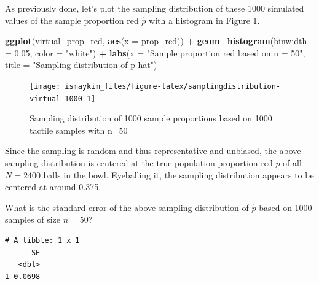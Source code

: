 \documentclass[12pt,]{krantz}
\makeatletter
\newenvironment{Shaded}{\begin{snugshade}}{\end{snugshade}}
\newcommand{\KeywordTok}[1]{\textcolor[rgb]{0.27,0.27,0.27}{\textbf{#1}}}
\newcommand{\DataTypeTok}[1]{\textcolor[rgb]{0.27,0.27,0.27}{#1}}
\newcommand{\FloatTok}[1]{\textcolor[rgb]{0.06,0.06,0.06}{#1}}
\newcommand{\StringTok}[1]{\textcolor[rgb]{0.5,0.5,0.5}{#1}}
\newcommand{\OperatorTok}[1]{\textcolor[rgb]{0.43,0.43,0.43}{\textbf{#1}}}
\newcommand{\NormalTok}[1]{#1}
\newenvironment{kframe}{%
\medskip{}
\setlength{\fboxsep}{.8em}
 \def\at@end@of@kframe{}%
 \ifinner\ifhmode%
  \def\at@end@of@kframe{\end{minipage}}%
  \begin{minipage}{\columnwidth}%
 \fi\fi%
 \def\FrameCommand##1{\hskip\@totalleftmargin \hskip-\fboxsep
 \colorbox{shadecolor}{##1}\hskip-\fboxsep
     \hskip-\linewidth \hskip-\@totalleftmargin \hskip\columnwidth}%
 \MakeFramed {\advance\hsize-\width
   \@totalleftmargin\z@ \linewidth\hsize
   \@setminipage}}%
 {\par\unskip\endMakeFramed%
 \at@end@of@kframe}
\renewenvironment{Shaded}{\begin{kframe}}{\end{kframe}}
\theoremstyle{definition}
\theoremstyle{definition}
\theoremstyle{definition}
\theoremstyle{remark}
\makeatother
\begin{document}
As previously done, let's plot the sampling distribution of these 1000
simulated values of the sample proportion red \(\widehat{p}\) with a
histogram in Figure \ref{fig:samplingdistribution-virtual-1000}.

\begin{Shaded}
\begin{Highlighting}[]
\KeywordTok{ggplot}\NormalTok{(virtual_prop_red, }\KeywordTok{aes}\NormalTok{(}\DataTypeTok{x =}\NormalTok{ prop_red)) }\OperatorTok{+}
\StringTok{  }\KeywordTok{geom_histogram}\NormalTok{(}\DataTypeTok{binwidth =} \FloatTok{0.05}\NormalTok{, }\DataTypeTok{color =} \StringTok{"white"}\NormalTok{) }\OperatorTok{+}
\StringTok{  }\KeywordTok{labs}\NormalTok{(}\DataTypeTok{x =} \StringTok{"Sample proportion red based on n = 50"}\NormalTok{, }
       \DataTypeTok{title =} \StringTok{"Sampling distribution of p-hat"}\NormalTok{) }
\end{Highlighting}
\end{Shaded}

\begin{figure}

{\centering \texttt{[image: ismaykim\_files/figure-latex/samplingdistribution-virtual-1000-1]} 

}

\caption{Sampling distribution of 1000 sample proportions based on 1000 tactile samples with n=50}\label{fig:samplingdistribution-virtual-1000}
\end{figure}

Since the sampling is random and thus representative and unbiased, the
above sampling distribution is centered at the true population
proportion red \(p\) of all \(N=2400\) balls in the bowl. Eyeballing it,
the sampling distribution appears to be centered at around 0.375.

What is the standard error of the above sampling distribution of
\(\widehat{p}\) based on 1000 samples of size \(n=50\)?

\begin{Shaded}
\end{Shaded}

\begin{verbatim}
# A tibble: 1 x 1
      SE
   <dbl>
1 0.0698
\end{verbatim}
\end{document}
